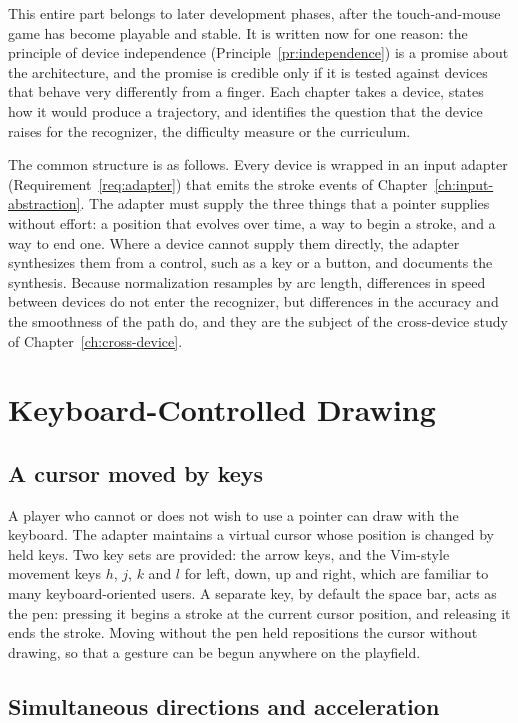 This entire part belongs to later development phases, after the touch-and-mouse game has become playable and stable. It is written now for one reason: the principle of device independence (Principle~\ref{pr:independence}) is a promise about the architecture, and the promise is credible only if it is tested against devices that behave very differently from a finger. Each chapter takes a device, states how it would produce a trajectory, and identifies the question that the device raises for the recognizer, the difficulty measure or the curriculum.

The common structure is as follows. Every device is wrapped in an input adapter (Requirement~\ref{req:adapter}) that emits the stroke events of Chapter~\ref{ch:input-abstraction}. The adapter must supply the three things that a pointer supplies without effort: a position that evolves over time, a way to begin a stroke, and a way to end one. Where a device cannot supply them directly, the adapter synthesizes them from a control, such as a key or a button, and documents the synthesis. Because normalization resamples by arc length, differences in speed between devices do not enter the recognizer, but differences in the accuracy and the smoothness of the path do, and they are the subject of the cross-device study of Chapter~\ref{ch:cross-device}.

\chapter{Keyboard-Controlled Drawing}\label{ch:keyboard-drawing}

\section{A cursor moved by keys}

A player who cannot or does not wish to use a pointer can draw with the keyboard. The adapter maintains a virtual cursor whose position is changed by held keys. Two key sets are provided: the arrow keys, and the Vim-style movement keys $h$, $j$, $k$ and $l$ for left, down, up and right, which are familiar to many keyboard-oriented users. A separate key, by default the space bar, acts as the pen: pressing it begins a stroke at the current cursor position, and releasing it ends the stroke. Moving without the pen held repositions the cursor without drawing, so that a gesture can be begun anywhere on the playfield.

\section{Simultaneous directions and acceleration}

